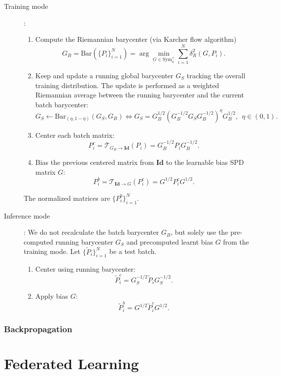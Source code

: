 \documentclass[10pt,a4paper]{book}
\theoremstyle{definition}
\theoremstyle{plain}
\theoremstyle{remark}
\newcommand{\Id}{\mathrm{\textbf{Id}}}
\begin{document}
\begin{description}
\item[Training mode]: 
\begin{enumerate}
\item Compute the Riemannian barycenter (via Karcher flow algorithm)
$$G_B=\text{Bar}(\{P_i\}_{i=1}^{N})=\arg\min_{G\in \text{Sym}_n^{+}}\sum_{i=1}^{N}\delta_R^{2}(G,P_i).$$
\item Keep and update a running global barycenter $G_S$ tracking the overall training distribution. The update is performed as a weighted Riemannian average between the running barycenter and the current batch barycenter:
$$G_S\leftarrow \text{Bar}_{(\eta,1-\eta)}(G_S,G_B) \iff G_S=G_B^{1/2}(G_B^{-1/2}G_SG_B^{-1/2})^{\eta}G_B^{1/2},~~\eta \in (0,1).$$
\item Center each batch matrix:
$$P_i^{c}=\mathcal{T}_{G_B\to \Id}(P_i)=G_B^{-1/2}P_iG_B^{-1/2}.$$
\item Bias the previous centered matrix from $\Id$ to the learnable bias SPD matrix $G$:
$$P_{i}^{b}=\mathcal{T}_{\Id \to G}(P_i^{c})=G^{1/2}P_i^{c}G^{1/2}.$$
\end{enumerate}
The normalized matrices are $\{P_i^{b}\}_{i=1}^{N}$. 
\item[Inference mode]:
We do not recalculate the batch barycenter $G_B$, but solely use the pre-computed running barycenter $G_S$  and precomputed learnt bias $G$ from the training mode. Let $\{\tilde{P}_i\}_{i=1}^{N}$ be a test batch. 
\begin{enumerate}
\item Center using running barycenter:
$$\tilde{P}_i^{c}=G_S^{-1/2}\tilde{P}_iG_S^{-1/2}.$$
\item Apply bias $G$:
$$\tilde{P}_i^{b}=G^{1/2}\tilde{P}_i^{c}G^{1/2}.$$
\end{enumerate}
\end{description}
\subsection{Backpropagation}



\chapter{Federated Learning}
\end{document}
